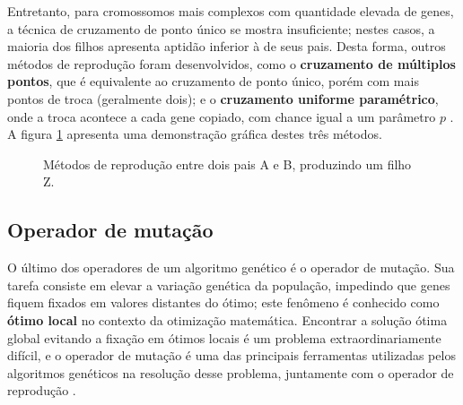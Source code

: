 \documentclass[12pt]{article}
\begin{document}
Entretanto, para cromossomos mais complexos com quantidade elevada de genes, a técnica de cruzamento de ponto único se mostra insuficiente; nestes casos, a maioria dos filhos apresenta aptidão inferior à de seus pais. Desta forma, outros métodos de reprodução foram desenvolvidos, como o \textbf{cruzamento de múltiplos pontos}, que é equivalente ao cruzamento de ponto único, porém com mais pontos de troca (geralmente dois); e o \textbf{cruzamento uniforme paramétrico}, onde a troca acontece a cada gene copiado, com chance igual a um parâmetro $p$ \cite{Mitchell1998}. A figura \ref{fig:crossover} apresenta uma demonstração gráfica destes três métodos.

\begin{figure}
    \centering
    \hspace{0.8cm}
    \hspace{0.8cm}
    \caption{Métodos de reprodução entre dois pais A e B, produzindo um filho Z.}
    \label{fig:crossover}
\end{figure}

\subsection{Operador de mutação} \label{sec:mutation}

O último dos operadores de um algoritmo genético é o operador de mutação. Sua tarefa consiste em elevar a variação genética da população, impedindo que genes fiquem fixados em valores distantes do ótimo; este fenômeno é conhecido como \textbf{ótimo local} no contexto da otimização matemática. Encontrar a solução ótima global evitando a fixação em ótimos locais é um problema extraordinariamente difícil, e o operador de mutação é uma das principais ferramentas utilizadas pelos algoritmos genéticos na resolução desse problema, juntamente com o operador de reprodução \cite{Mitchell1998}.
\end{document}
